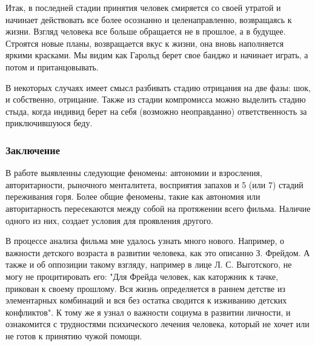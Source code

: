 \documentclass[a4paper,12pt]{report} %
\begin{document}
Итак, в последней стадии принятия человек смиряется со своей утратой и начинает действовать все более осознанно и целенаправленно, возвращаясь к жизни. Взгляд человека все больше обращается не в прошлое, а в будущее. Строятся новые планы, возвращается вкус к жизни, она вновь наполняется яркими красками. Мы видим как Гарольд берет свое банджо и начинает играть, а потом и пританцовывать. 

В некоторых случаях имеет смысл разбивать стадию отрицания на две фазы: шок, и собственно, отрицание. Также из стадии компромисса можно выделить стадию стыда, когда индивид берет на себя (возможно неоправданно) ответственность за приключившуюся беду.



\subsubsection{Заключение}
В работе выявленны следующие феномены: автономии и взросления, авторитарности, рыночного менталитета, восприятия запахов и 5 (или 7) стадий переживания горя. Более общие феномены, такие как автономия или авторитарность пересекаются между собой на протяжении всего фильма. Наличие одного из них, создает условия для проявления другого. 

В процессе анализа фильма мне удалось узнать много нового.  Например, о важности детского возраста в развитии человека, как это описанно З. Фрейдом. А также и об оппозиции такому  взгляду, например в лице Л. С. Выготского, не могу не процитировать его: "Для Фрейда человек, как каторжник к тачке, прикован к своему прошлому. Вся жизнь определяется в раннем детстве из элементарных комбинаций и вся без остатка сводится к изживанию детских конфликтов". К тому же я узнал о важности социума в развитии личности, и ознакомится с трудностями психического лечения человека, который не хочет или не готов к принятию чужой помощи.
\end{document}
